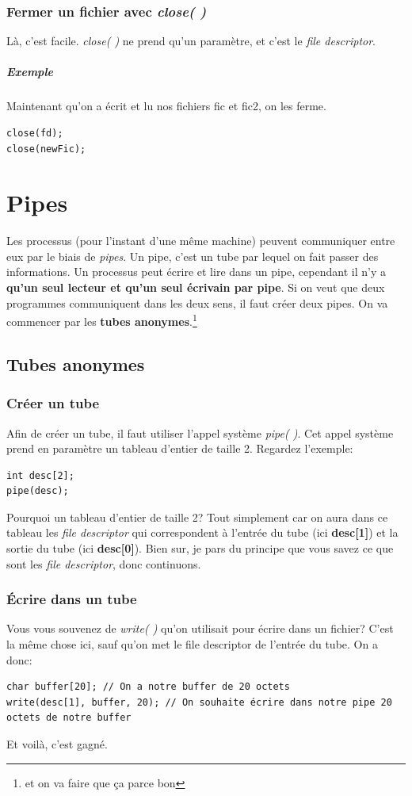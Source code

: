 \documentclass{report}
\begin{document}
\subsection{Fermer un fichier avec \emph{close( )}}
Là, c'est facile. \emph{close( )} ne prend qu'un paramètre, et c'est le \emph{file descriptor}.
\paragraph{Exemple}
Maintenant qu'on a écrit et lu nos fichiers fic et fic2, on les ferme.
\begin{lstlisting}
close(fd);
close(newFic);
\end{lstlisting}




\chapter{Pipes}
Les processus (pour l'instant d'une même machine) peuvent communiquer entre eux par le biais de \emph{pipes}. Un pipe, c'est un tube par lequel on fait passer des informations. Un processus peut écrire et lire dans un pipe, cependant il n'y a \textbf{qu'un seul lecteur et qu'un seul écrivain par pipe}. Si on veut que deux programmes communiquent dans les deux sens, il faut créer deux pipes.
On va commencer par les \textbf{tubes anonymes}.\footnote{et on va faire que ça parce bon}

\section{Tubes anonymes}
\subsection{Créer un tube}
Afin de créer un tube, il faut utiliser l'appel système \emph{pipe( )}. Cet appel système prend en paramètre un tableau d'entier de taille 2. Regardez l'exemple:
\begin{verbatim}
int desc[2];
pipe(desc);
\end{verbatim}
Pourquoi un tableau d'entier de taille 2? Tout simplement car on aura dans ce tableau les \emph{file descriptor} qui correspondent à l'entrée du tube (ici \textbf{desc[1]}) et la sortie du tube (ici \textbf{desc[0]}). Bien sur, je pars du principe que vous savez ce que sont les \emph{file descriptor}, donc continuons.

\subsection{Écrire dans un tube}
Vous vous souvenez de \emph{write( )} qu'on utilisait pour écrire dans un fichier? C'est la même chose ici, sauf qu'on met le file descriptor de l'entrée du tube. On a donc:
\begin{verbatim}
char buffer[20]; // On a notre buffer de 20 octets
write(desc[1], buffer, 20); // On souhaite écrire dans notre pipe 20 octets de notre buffer
\end{verbatim}
Et voilà, c'est gagné.
\end{document}
